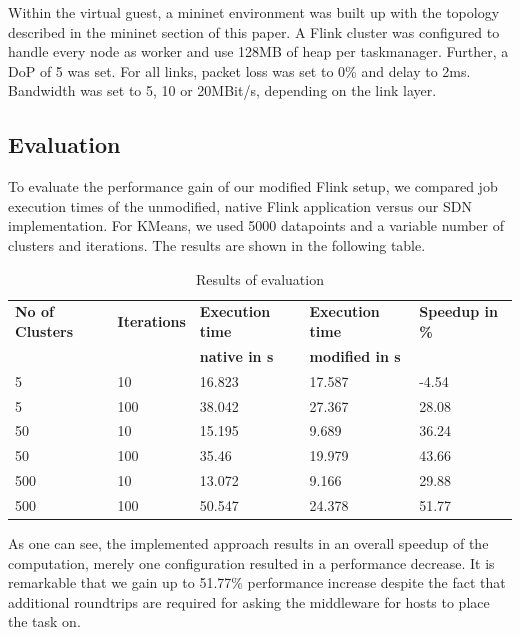 Within the virtual guest, a mininet environment was built up with the topology described in the
mininet section of this paper. A Flink cluster was configured to handle every node as worker and use
128MB of heap per taskmanager. Further, a DoP of 5 was set. For all links, packet loss was set to 0\%
and delay to 2ms. Bandwidth was set to 5, 10 or 20MBit/s, depending on the link layer.

\subsection{Evaluation}
To evaluate the performance gain of our modified Flink setup, we compared job execution times of the
unmodified, native Flink application versus our SDN implementation. For KMeans, we used 5000
datapoints and a variable number of clusters and iterations. The results are shown in the following
table.

\begin{table}[h]
    \centering
    \begin{tabular}{| l | l | l | l | l | }
        \hline
        \textbf{No of Clusters} & \textbf{Iterations} & \textbf{Execution time}
            & \textbf{Execution time} & \textbf{Speedup in \%} \\
        & & \textbf{native in s} & \textbf{modified in s} & \\ \hline

        5 & 10 & 16.823 & 17.587 & -4.54 \\ \hline
        5 & 100 & 38.042 & 27.367 & 28.08 \\ \hline
        50 &10 &15.195 &9.689 &36.24 \\ \hline
        50 &100 &35.46 &19.979 &43.66 \\ \hline
        500 &10 &13.072 &9.166 &29.88 \\ \hline
        500 &100 &50.547 &24.378 &51.77 \\ \hline
    \end{tabular}
    \caption{Results of evaluation}
    \label{table:guest_properties}
\end{table}

As one can see, the implemented approach results in an overall speedup of the computation, merely
one configuration resulted in a performance decrease. It is remarkable that we gain up to 51.77\%
performance increase despite the fact that additional roundtrips are required for asking the
middleware for hosts to place the task on.
